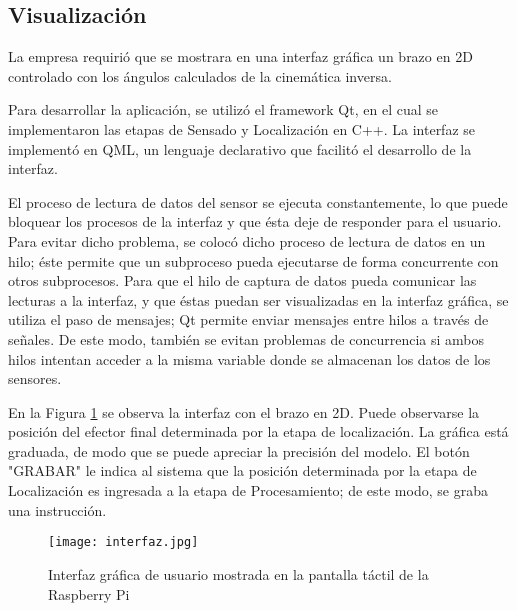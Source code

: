 \subsection{Visualización}

La empresa requirió que se mostrara en una interfaz gráfica un brazo en 2D controlado con los ángulos calculados de la cinemática inversa.

Para desarrollar la aplicación, se utilizó el framework Qt, en el cual se implementaron las etapas de Sensado y Localización en C++. La interfaz se implementó en QML, un lenguaje declarativo que facilitó el desarrollo de la interfaz.

El proceso de lectura de datos del sensor se ejecuta constantemente, lo que puede bloquear los procesos de la interfaz y que ésta deje de responder para el usuario. Para evitar dicho problema, se colocó dicho proceso de lectura de datos en un hilo; éste permite que un subproceso pueda ejecutarse de forma concurrente con otros subprocesos. Para que el hilo de captura de datos pueda comunicar las lecturas a la interfaz, y que éstas puedan ser visualizadas en la interfaz gráfica, se utiliza el paso de mensajes; Qt permite enviar mensajes entre hilos a través de señales. De este modo, también se evitan problemas de concurrencia si ambos hilos intentan acceder a la misma variable donde se almacenan los datos de los sensores.

En la Figura \ref{fig:interfaz} se observa la interfaz con el brazo en 2D. Puede observarse la posición del efector final determinada por la etapa de localización. La gráfica está graduada, de modo que se puede apreciar la precisión del modelo. El botón "GRABAR" le indica al sistema que la posición determinada por la etapa de Localización es ingresada a la etapa de Procesamiento; de este modo, se graba una instrucción.

\begin{figure}[htb]
	\centering
	\texttt{[image: interfaz.jpg]}
	\caption{Interfaz gráfica de usuario mostrada en la pantalla táctil de la Raspberry Pi}
	\label{fig:interfaz}
\end{figure}